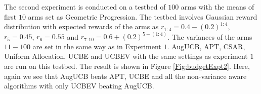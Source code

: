 	The second experiment is conducted on a testbed of $100$ arms with the means of first $10$ arms set as Geometric Progression. The testbed involves Gaussian reward distribution with expected rewards of the arms as $r_{1:4}=0.4-(0.2)^{1:4}$, $r_{5}=0.45$, $r_{6}=0.55$ and $r_{7:10}=0.6+(0.2)^{5-(1:4)}$. The variances of the arms $11-100$ are set in the same way as in Experiment $1$. AugUCB, APT, CSAR, Uniform Allocation, UCBE and UCBEV with the same settings as experiment $1$ are run on this testbed. The result is shown in Figure \ref{Fig:budgetExpt2}. Here, again we see that AugUCB beats APT, UCBE and all the non-variance aware algorithms with only UCBEV beating AugUCB. 
	
	



